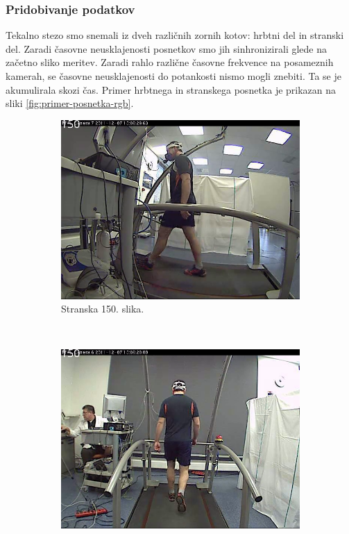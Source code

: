 \subsubsection{Pridobivanje podatkov}
Tekalno stezo smo snemali iz dveh različnih zornih kotov: hrbtni del in stranski del. Zaradi časovne neusklajenosti posnetkov smo jih sinhronizirali glede na začetno sliko meritev. Zaradi rahlo različne časovne frekvence na posameznih kamerah, se časovne neusklajenosti do potankosti nismo mogli znebiti. Ta se je akumulirala skozi čas. Primer hrbtnega in stranskega posnetka je prikazan na sliki \ref{fig:primer-posnetka-rgb}.

\begin{figure}[htb]
	\centering
	\begin{subfigure}{0.45\columnwidth}
		\includegraphics[width=\columnwidth]{./Slike/normal-sv-150.png}
		\caption{Stranska 150. slika.}
	\end{subfigure}
	~
	\begin{subfigure}{0.45\columnwidth}
		\includegraphics[width=\columnwidth]{./Slike/normal-bv-150.png}

\end{subfigure}
\end{figure}
